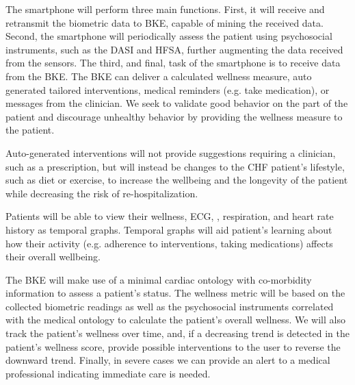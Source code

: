 The smartphone will perform three main functions. First, it will receive and retransmit the biometric data to BKE, capable of mining the received data. Second, the smartphone will periodically assess the patient using psychosocial instruments, such as the DASI and HFSA, further augmenting the data received from the sensors. The third, and final, task of the smartphone is to receive data from the BKE. The BKE can deliver a calculated wellness measure, auto generated tailored interventions, medical reminders (e.g. take medication), or messages from the clinician. We seek to validate good behavior on the part of the patient and discourage unhealthy behavior by providing the wellness measure to the patient. 

Auto-generated interventions will not provide suggestions requiring a clinician, such as a prescription, but will instead be changes to the CHF patient's lifestyle, such as diet or exercise, to increase the wellbeing and the longevity of the patient while decreasing the risk of re-hospitalization. 

Patients will be able to view their wellness, ECG, , respiration, and heart rate history as temporal graphs. Temporal graphs will aid patient's learning about how their activity (e.g. adherence to interventions, taking medications) affects their overall wellbeing.

The BKE will make use of a minimal cardiac ontology with co-morbidity information to assess a patient's status. The wellness metric will be based on the collected biometric readings as well as the psychosocial instruments correlated with the medical ontology to calculate the patient's overall wellness. We will also track the patient's wellness over time, and, if a decreasing trend is detected in the patient's wellness score, provide possible interventions to the user to reverse the downward trend. Finally, in severe cases we can provide an alert to a medical professional indicating immediate care is needed.

